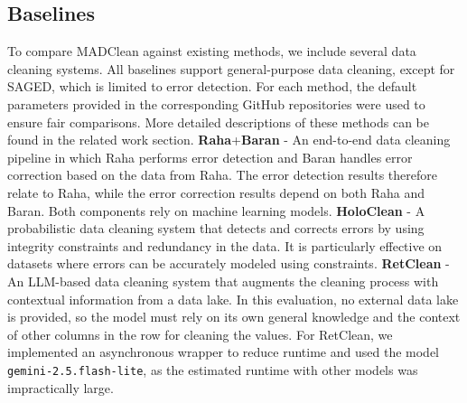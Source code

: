 \begin{table}[h]
\centering
{}
\caption{Summary of dataset characteristics.}
\label{tab:datasets}
\end{table}

\subsection{Baselines}
To compare MADClean against existing methods, we include several data cleaning systems. 
All baselines support general-purpose data cleaning, except for SAGED, which is limited to error detection. 
For each method, the default parameters provided in the corresponding GitHub repositories were used to ensure fair comparisons. 
More detailed descriptions of these methods can be found in the related work section.
\newline\newline
\textbf{Raha}+\textbf{Baran} \cite{RAHA,BARAN} - An end-to-end data cleaning pipeline in which Raha performs error detection and Baran handles error correction based on the data from Raha. 
The error detection results therefore relate to Raha, while the error correction results depend on both Raha and Baran. 
Both components rely on machine learning models.
\newline
\textbf{HoloClean} \cite{HOLOCLEAN} - A probabilistic data cleaning system that detects and corrects errors by using integrity constraints and redundancy in the data. 
It is particularly effective on datasets where errors can be accurately modeled using constraints.
\newline
\textbf{RetClean} \cite{RETCLEAN} - An LLM-based data cleaning system that augments the cleaning process with contextual information from a data lake. 
In this evaluation, no external data lake is provided, so the model must rely on its own general knowledge and the context of other columns in the row for cleaning the values.
For RetClean, we implemented an asynchronous wrapper to reduce runtime and used the model \texttt{gemini-2.5.flash-lite}, as the estimated runtime with other models was impractically large.
